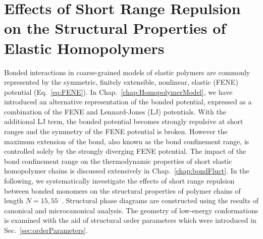 \documentclass[12pt]{report}
\begin{document}

\chapter{Effects of Short Range Repulsion on the Structural Properties of Elastic Homopolymers}
\label{chap:shortRangeRepuls}

Bonded interactions in coarse-grained models of elastic polymers are commonly represented by the symmetric, finitely extensible, nonlinear, elastic (FENE) potential (Eq.~\ref{eq:FENE}). In Chap.~\ref{chap:HomopolymerModel}, we have introduced an alternative representation of the bonded potential, expressed as a combination of the FENE and Lennard-Jones (LJ) potentials. With the additional LJ term, the bonded potential becomes strongly repulsive at short ranges and the symmetry of the FENE potential is broken. However the maximum extension of the bond, also known as the bond confinement range, is controlled solely by the strongly diverging FENE potential.  The impact of the bond confinement range on the thermodynamic properties of short elastic homopolymer chains is discussed extensively in Chap.~\ref{chap:bondFluct}. In the following, we systematically investigate the effects of short range repulsion between bonded monomers on the structural properties of polymer chains of length $N = 15,55$~\cite{Koci2016}. 
\newpage
\noindent
Structural phase diagrams are constructed using the results of canonical and microcanonical analysis. The geometry of low-energy conformations is examined with the aid of structural order parameters which were introduced in Sec.~\ref{sec:orderParameters}.

\end{document}
